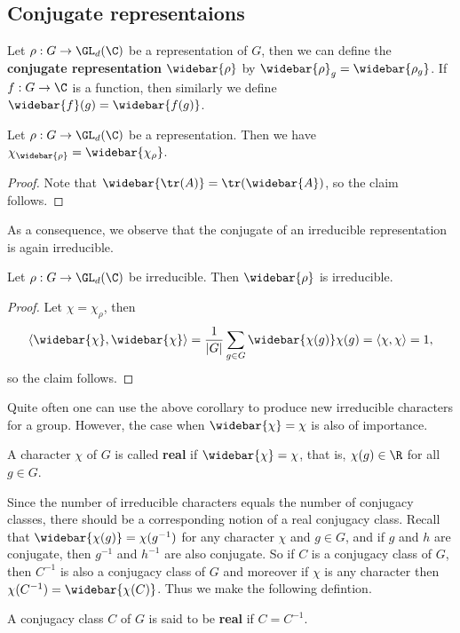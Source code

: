 \subsection{Conjugate representaions}
Let $\rho:G\to\GL_d(\C)$ be a representation of $G$, then we can define the \textbf{conjugate representation} $\widebar{\rho}$ by $\widebar{\rho}_g=\widebar{\rho_g}$. If $f:G\to\C$ is a function, then similarly we define $\widebar{f}(g)=\widebar{f(g)}$.
\begin{proposition}\label{representation conjugate character}
Let $\rho:G\to\GL_d(\C)$ be a representation. Then we have $\chi_{\widebar{\rho}}=\widebar{\chi_{\rho}}$.
\end{proposition}
\begin{proof}
Note that $\widebar{\tr(A)}=\tr(\widebar{A})$, so the claim follows.
\end{proof}
As a consequence, we observe that the conjugate of an irreducible representation is again irreducible.
\begin{corollary}
Let $\rho:G\to\GL_d(\C)$ be irreducible. Then $\widebar{\rho}$ is irreducible.
\end{corollary}
\begin{proof}
Let $\chi=\chi_\rho$, then
\[\langle\widebar{\chi},\widebar{\chi}\rangle=\frac{1}{|G|}\sum_{g\in G}\widebar{\chi(g)}\chi(g)=\langle\chi,\chi\rangle=1,\]
so the claim follows.
\end{proof}
Quite often one can use the above corollary to produce new irreducible characters for a group. However, the case when $\widebar{\chi}=\chi$ is also of importance.
\begin{definition}
A character $\chi$ of $G$ is called \textbf{real} if $\widebar{\chi}=\chi$, that is, $\chi(g)\in\R$ for all $g\in G$.
\end{definition}
Since the number of irreducible characters equals the number of conjugacy
classes, there should be a corresponding notion of a real conjugacy class. Recall that $\widebar{\chi(g)}=\chi(g^{-1})$ for any character $\chi$ and $g\in G$, and if $g$ and $h$ are conjugate, then $g^{-1}$ and $h^{-1}$ are also conjugate. So if $C$ is a conjugacy class of $G$, then $C^{-1}$ is also a conjugacy class of $G$ and moreover if $\chi$ is any character then $\chi(C^{-1})=\widebar{\chi(C)}$. Thus we make the following defintion.
\begin{definition}
A conjugacy class $C$ of $G$ is said to be \textbf{real} if $C=C^{-1}$.
\end{definition}
